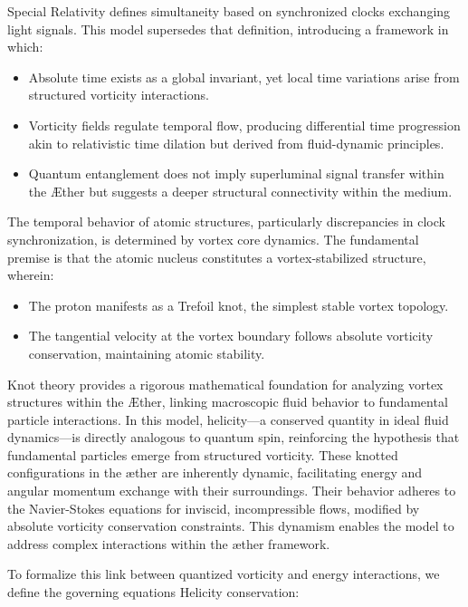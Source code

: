 Special Relativity defines simultaneity based on synchronized clocks exchanging light signals.
This model supersedes that definition, introducing a framework in which:

\begin{itemize}
    \item Absolute time exists as a global invariant, yet local time variations arise from structured vorticity interactions.
    \item Vorticity fields regulate temporal flow, producing differential time progression akin to relativistic time dilation but derived from fluid-dynamic principles.
    \item Quantum entanglement does not imply superluminal signal transfer within the \AE ther but suggests a deeper structural connectivity within the medium.
\end{itemize}

The temporal behavior of atomic structures, particularly discrepancies in clock synchronization, is determined by vortex core dynamics.
The fundamental premise is that the atomic nucleus constitutes a vortex-stabilized structure, wherein:

\begin{itemize}
    \item The proton manifests as a Trefoil knot, the simplest stable vortex topology.
    \item The tangential velocity at the vortex boundary follows absolute vorticity conservation, maintaining atomic stability.
\end{itemize}

Knot theory provides a rigorous mathematical foundation for analyzing vortex structures within the \AE ther, linking macroscopic fluid behavior to fundamental particle interactions.
In this model, helicity—a conserved quantity in ideal fluid dynamics—is directly analogous to quantum spin, reinforcing the hypothesis that fundamental particles emerge from structured vorticity.
These knotted configurations in the \ae ther are inherently dynamic, facilitating energy and angular momentum exchange with their surroundings.
Their behavior adheres to the Navier-Stokes equations for inviscid, incompressible flows, modified by absolute vorticity conservation constraints.
This dynamism enables the model to address complex interactions within the \ae ther framework.

To formalize this link between quantized vorticity and energy interactions, we define the governing equations Helicity conservation:

